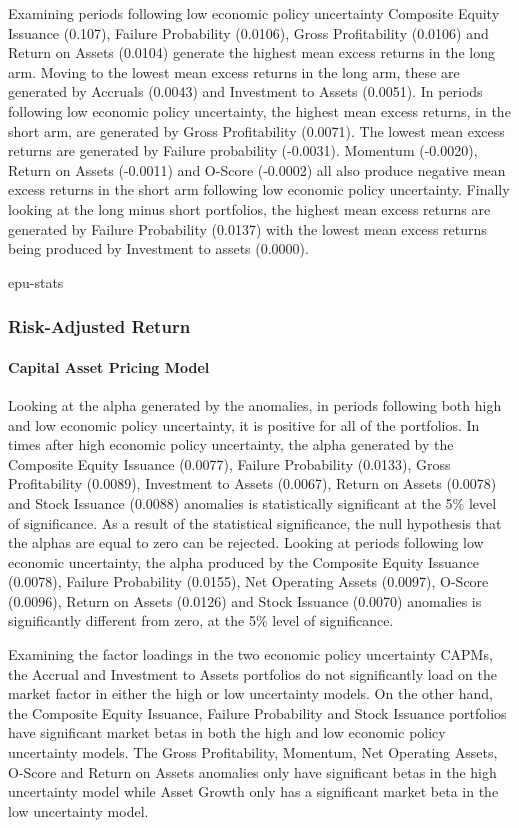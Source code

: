 \documentclass[12pt, a4paper, oneside]{article}
\begin{document}
Examining periods following low economic policy uncertainty Composite Equity Issuance (0.107), Failure Probability (0.0106), Gross Profitability (0.0106) and Return on Assets (0.0104) generate the highest mean excess returns in the long arm. Moving to the lowest mean excess returns in the long arm, these are generated by Accruals (0.0043) and Investment to Assets (0.0051). In periods following low economic policy uncertainty, the highest mean excess returns, in the short arm, are generated by Gross Profitability (0.0071). The lowest mean excess returns are generated by Failure probability (-0.0031). Momentum (-0.0020), Return on Assets (-0.0011) and O-Score (-0.0002) all also produce negative mean excess returns in the short arm following low economic policy uncertainty. Finally looking at the long minus short portfolios, the highest mean excess returns are generated by Failure Probability (0.0137) with the lowest mean excess returns being produced by Investment to assets (0.0000).

{epu-stats}

\subsubsection{Risk-Adjusted Return}
\paragraph{Capital Asset Pricing Model}
Looking at the alpha generated by the anomalies, in periods following both high and low economic policy uncertainty, it is positive for all of the portfolios. In times after high economic policy uncertainty, the alpha generated by the Composite Equity Issuance (0.0077), Failure Probability (0.0133), Gross Profitability (0.0089), Investment to Assets (0.0067), Return on Assets (0.0078) and Stock Issuance (0.0088) anomalies is statistically significant at the 5\% level of significance. As a result of the statistical significance, the null hypothesis that the alphas are equal to zero can be rejected. Looking at periods following low economic uncertainty, the alpha produced by the Composite Equity Issuance (0.0078), Failure Probability (0.0155), Net Operating Assets (0.0097), O-Score (0.0096), Return on Assets (0.0126) and Stock Issuance (0.0070) anomalies is significantly different from zero, at the 5\% level of significance. 

Examining the factor loadings in the two economic policy uncertainty CAPMs, the Accrual and Investment to Assets portfolios do not significantly load on the market factor in either the high or low uncertainty models. On the other hand, the Composite Equity Issuance, Failure Probability and Stock Issuance portfolios have significant market betas in both the high and low economic policy uncertainty models. The Gross Profitability, Momentum, Net Operating Assets, O-Score and Return on Assets anomalies only have significant betas in the high uncertainty model while Asset Growth only has a significant market beta in the low uncertainty model.
\end{document}

